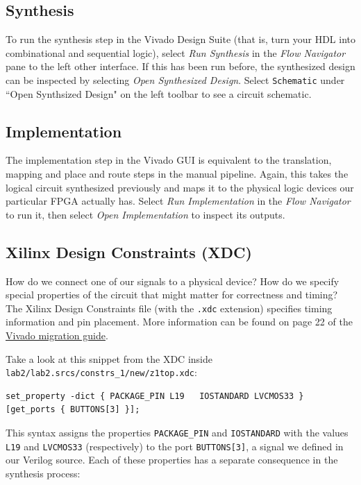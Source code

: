 \documentclass[11pt]{article}
\begin{document}
\subsection{Synthesis}
To run the synthesis step in the Vivado Design Suite (that is, turn your HDL into combinational and sequential logic), select \emph{Run Synthesis} in the \emph{Flow Navigator} pane to the left other interface. If this has been run before, the synthesized design can be inspected by selecting \emph{Open Synthesized Design}. Select \texttt{Schematic} under ``Open Synthsized Design" on the left toolbar to see a circuit schematic.

\subsection{Implementation}
The implementation step in the Vivado GUI is equivalent to the translation, mapping and place and route steps in the manual pipeline. Again, this takes the logical circuit synthesized previously and maps it to the physical logic devices our particular FPGA actually has. Select \emph{Run Implementation} in the \emph{Flow Navigator} to run it, then select \emph{Open Implementation} to inspect its outputs.

\subsection{Xilinx Design Constraints (XDC)}
How do we connect one of our signals to a physical device? How do we specify special properties of the circuit that might matter for correctness and timing?
The Xilinx Design Constraints file (with the \verb|.xdc| extension) specifies timing information and pin placement.
More information can be found on page 22 of the \href{https://www.xilinx.com/support/documentation/sw_manuals/xilinx2015_2/ug911-vivado-migration.pdf}{Vivado migration guide}.

Take a look at this snippet from the XDC inside \verb|lab2/lab2.srcs/constrs_1/new/z1top.xdc|:
\begin{verbatim}
set_property -dict { PACKAGE_PIN L19   IOSTANDARD LVCMOS33 } [get_ports { BUTTONS[3] }];
\end{verbatim}

This syntax assigns the properties \verb|PACKAGE_PIN| and \verb|IOSTANDARD| with the values \verb|L19| and \verb|LVCMOS33| (respectively) to the port \verb|BUTTONS[3]|, a signal we defined in our Verilog source. Each of these properties has a separate consequence in the synthesis process:
\end{document}
